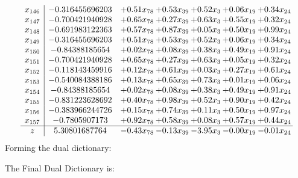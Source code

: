 \documentclass[8pt]{article}
\begin{document}
\[\begin{array}{c| c c@{\hskip 2pt} c@{\hskip 2pt} c@{\hskip 2pt} c@{\hskip 2pt} c@{\hskip 2pt} }
 x_{146}   &  -0.316455696203 & +  0.51 x_{78} & +  0.53 x_{39} & +  0.52 x_{3} & +  0.06 x_{19} & +  0.34 x_{24}\\
 x_{147}   &  -0.700421940928 & +  0.65 x_{78} & +  0.27 x_{39} & +  0.63 x_{3} & +  0.55 x_{19} & +  0.32 x_{24}\\
 x_{148}   &  -0.691983122363 & +  0.57 x_{78} & +  0.87 x_{39} & +  0.05 x_{3} & +  0.50 x_{19} & +  0.99 x_{24}\\
 x_{149}   &  -0.316455696203 & +  0.51 x_{78} & +  0.53 x_{39} & +  0.52 x_{3} & +  0.06 x_{19} & +  0.34 x_{24}\\
 x_{150}   &  -0.84388185654 & +  0.02 x_{78} & +  0.08 x_{39} & +  0.38 x_{3} & +  0.49 x_{19} & +  0.91 x_{24}\\
 x_{151}   &  -0.700421940928 & +  0.65 x_{78} & +  0.27 x_{39} & +  0.63 x_{3} & +  0.05 x_{19} & +  0.32 x_{24}\\
 x_{152}   &  -0.118143459916 & +  0.12 x_{78} & +  0.61 x_{39} & +  0.03 x_{3} & +  0.27 x_{19} & +  0.61 x_{24}\\
 x_{153}   &  -0.540084388186 & +  0.13 x_{78} & +  0.65 x_{39} & +  0.73 x_{3} & +  0.01 x_{19} & +  0.06 x_{24}\\
 x_{154}   &  -0.84388185654 & +  0.02 x_{78} & +  0.08 x_{39} & +  0.38 x_{3} & +  0.49 x_{19} & +  0.91 x_{24}\\
 x_{155}   &  -0.831223628692 & +  0.40 x_{78} & +  0.98 x_{39} & +  0.52 x_{3} & +  0.90 x_{19} & +  0.42 x_{24}\\
 x_{156}   &  -0.383966244726 & +  0.15 x_{78} & +  0.74 x_{39} & +  0.11 x_{3} & +  0.50 x_{19} & +  0.97 x_{24}\\
 x_{157}   &  -0.7805907173 & +  0.92 x_{78} & +  0.58 x_{39} & +  0.08 x_{3} & +  0.57 x_{19} & +  0.44 x_{24}\\
\hline
z    &  5.30801687764 & -0.43 x_{78} & -0.13 x_{39} & -3.95 x_{3} & -0.00 x_{19} & -0.01 x_{24}\\
\end{array}\]
Forming the dual dictionary:

The Final Dual Dictionary is: 
\end{document}
